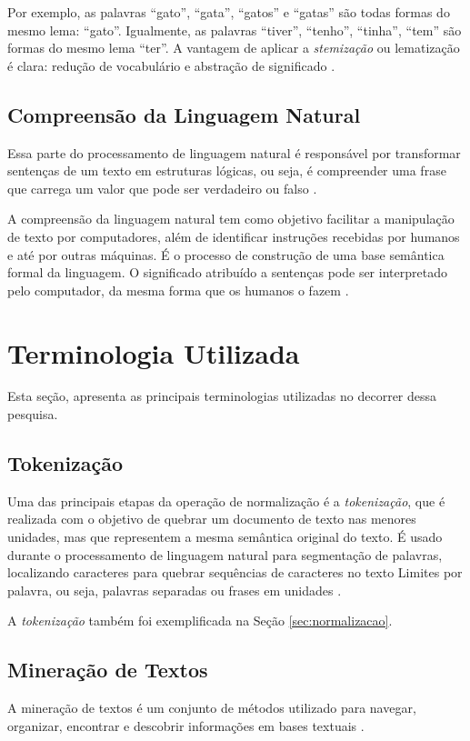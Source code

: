 Por exemplo, as palavras “gato”, “gata”, “gatos” e “gatas” são todas formas do mesmo lema: “gato”. 
Igualmente, as palavras “tiver”, “tenho”, “tinha”, “tem” são formas do mesmo lema “ter”. A vantagem de 
aplicar a \textit{stemização} ou lematização é clara: redução de vocabulário e abstração de significado
\cite{santos2022processamento}.

\subsection{Compreensão da Linguagem Natural}
\label{sec:compreensao-linguagem-natural}
Essa parte do processamento de linguagem natural é responsável por transformar sentenças de um texto em 
estruturas lógicas, ou seja, é compreender uma frase que carrega um valor que pode ser verdadeiro ou falso 
\cite{frutuoso2018processamento}.

A compreensão da linguagem natural tem como objetivo facilitar a manipulação de texto por computadores, além 
de identificar instruções recebidas por humanos e até por outras máquinas. É o processo de construção de uma 
base semântica formal da linguagem. O significado atribuído a sentenças pode ser interpretado pelo 
computador, da mesma forma que os humanos o fazem \cite{d2022inteligencia}.

\section{Terminologia Utilizada}
\label{sec:terminologia-utilizada}
Esta seção, apresenta as principais terminologias utilizadas no decorrer dessa pesquisa.

\subsection{Tokenização}
\label{sec:tokenizacao}
Uma das principais etapas da operação de normalização é a \textit{tokenização}, que é realizada com o objetivo de quebrar um documento de texto nas menores unidades, mas que representem a mesma semântica original do texto. É usado durante o processamento de linguagem natural para segmentação de palavras, localizando caracteres para quebrar sequências de caracteres no texto Limites por palavra, ou seja, palavras separadas ou frases em unidades \cite{rodriguez2020processamento}.

A \textit{tokenização} também foi exemplificada na Seção \ref{sec:normalizacao}.

\subsection{Mineração de Textos}
\label{sec:mineracao-textos}
A mineração de textos é um conjunto de métodos utilizado para navegar, organizar, encontrar e descobrir informações em bases textuais \cite{deuso}.

